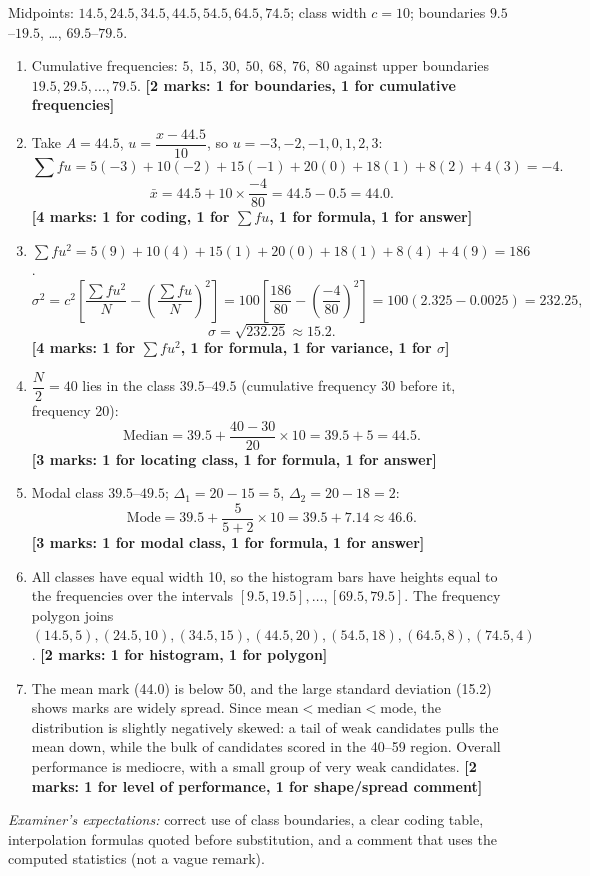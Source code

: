 \documentclass[11pt]{article}
\newcounter{popsec}
\newcounter{popsub}
\newcommand{\courssub}[1]{%
  \stepcounter{popsub}%
  \par\vspace{9pt}\noindent{\popxbold\fontsize{11.5}{13}\selectfont\color{popink}{\color{poporange}\thepopsec.\thepopsub}\hspace{6pt}#1}\par\nopagebreak\vspace{4pt}
}
\begin{document}
\courssub{I prepare for the GCE}

\begin{corrige}
Midpoints: $14.5, 24.5, 34.5, 44.5, 54.5, 64.5, 74.5$; class width $c = 10$; boundaries $9.5$--$19.5$, \dots, $69.5$--$79.5$.
\begin{enumerate}
\item Cumulative frequencies: $5,\ 15,\ 30,\ 50,\ 68,\ 76,\ 80$ against upper boundaries $19.5, 29.5, \dots, 79.5$. \hfill \textbf{[2 marks: 1 for boundaries, 1 for cumulative frequencies]}
\item Take $A = 44.5$, $u = \dfrac{x - 44.5}{10}$, so $u = -3, -2, -1, 0, 1, 2, 3$:
\[
\sum fu = 5(-3) + 10(-2) + 15(-1) + 20(0) + 18(1) + 8(2) + 4(3) = -4.
\]
\[
\bar{x} = 44.5 + 10\times\frac{-4}{80} = 44.5 - 0.5 = 44.0.
\]
\textbf{[4 marks: 1 for coding, 1 for $\sum fu$, 1 for formula, 1 for answer]}
\item $\sum fu^2 = 5(9) + 10(4) + 15(1) + 20(0) + 18(1) + 8(4) + 4(9) = 186$.
\[
\sigma^2 = c^2\left[\frac{\sum fu^2}{N} - \left(\frac{\sum fu}{N}\right)^2\right] = 100\left[\frac{186}{80} - \left(\frac{-4}{80}\right)^2\right] = 100(2.325 - 0.0025) = 232.25,
\]
\[
\sigma = \sqrt{232.25} \approx 15.2.
\]
\textbf{[4 marks: 1 for $\sum fu^2$, 1 for formula, 1 for variance, 1 for $\sigma$]}
\item $\dfrac{N}{2} = 40$ lies in the class $39.5$--$49.5$ (cumulative frequency 30 before it, frequency 20):
\[
\text{Median} = 39.5 + \frac{40 - 30}{20}\times 10 = 39.5 + 5 = 44.5.
\]
\textbf{[3 marks: 1 for locating class, 1 for formula, 1 for answer]}
\item Modal class $39.5$--$49.5$; $\Delta_1 = 20 - 15 = 5$, $\Delta_2 = 20 - 18 = 2$:
\[
\text{Mode} = 39.5 + \frac{5}{5+2}\times 10 = 39.5 + 7.14 \approx 46.6.
\]
\textbf{[3 marks: 1 for modal class, 1 for formula, 1 for answer]}
\item All classes have equal width 10, so the histogram bars have heights equal to the frequencies over the intervals $[9.5, 19.5], \dots, [69.5, 79.5]$. The frequency polygon joins $(14.5, 5), (24.5, 10), (34.5, 15), (44.5, 20), (54.5, 18), (64.5, 8), (74.5, 4)$. \hfill \textbf{[2 marks: 1 for histogram, 1 for polygon]}
\item The mean mark (44.0) is below 50, and the large standard deviation (15.2) shows marks are widely spread. Since $\text{mean} < \text{median} < \text{mode}$, the distribution is slightly negatively skewed: a tail of weak candidates pulls the mean down, while the bulk of candidates scored in the 40--59 region. Overall performance is mediocre, with a small group of very weak candidates. \hfill \textbf{[2 marks: 1 for level of performance, 1 for shape/spread comment]}
\end{enumerate}
\emph{Examiner's expectations:} correct use of class boundaries, a clear coding table, interpolation formulas quoted before substitution, and a comment that uses the computed statistics (not a vague remark).
\end{corrige}
\end{document}
